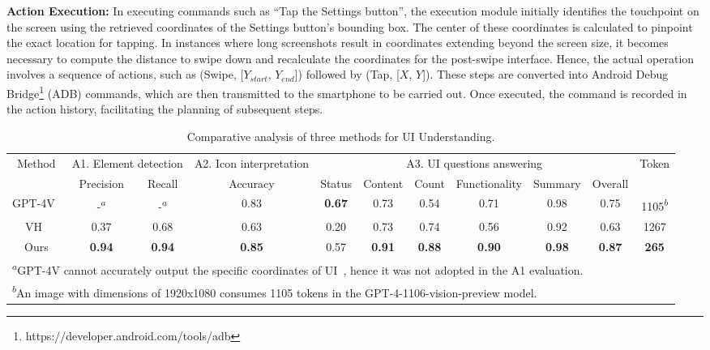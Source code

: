 \textbf{Action Execution:} In executing commands such as ``Tap the Settings button'', the execution module initially identifies the touchpoint on the screen using the retrieved coordinates of the Settings button's bounding box. The center of these coordinates is calculated to pinpoint the exact location for tapping. In instances where long screenshots result in coordinates extending beyond the screen size, it becomes necessary to compute the distance to swipe down and recalculate the coordinates for the post-swipe interface. Hence, the actual operation involves a sequence of actions, such as (Swipe, [$Y_{start}$, $Y_{end}$]) followed by (Tap, [$X$, $Y$]). These steps are converted into Android Debug Bridge\footnote{https://developer.android.com/tools/adb} (ADB) commands, which are then transmitted to the smartphone to be carried out. Once executed, the command is recorded in the action history, facilitating the planning of subsequent steps. 

\begin{table*}
    \centering
    \footnotesize
    \renewcommand{\arraystretch}{1.2}
    \caption{Comparative analysis of three methods for UI Understanding.}
    \label{tab:7_1}
    \begin{tabular}{ccccccccccc}
        \toprule
        \multirow{2}{*}{Method} & \multicolumn{2}{c}{A1. Element detection} & \multirow{1}{*}{A2. Icon interpretation} &\multicolumn{6}{c}{A3. UI  questions answering} & \multirow{2}{*}{Token}\\
        \cmidrule(lr){2-3} \cmidrule(lr){4-4} \cmidrule(lr){5-10}
        & Precision& Recall &   Accuracy   & Status & Content & Count & Functionality & Summary & Overall &     \\
        \midrule               
        GPT-4V~\cite{OpenAIGPT4V2023}&    -\textsuperscript{$a$} &    -\textsuperscript{$a$} & 0.83 & \textbf{0.67} & 0.73 & 0.54 & 0.71 & 0.98 & 0.75 & 1105\textsuperscript{$b$}\\
        VH~\cite{wang2023enabling}    & 0.37 & 0.68 & 0.63 & 0.20 & 0.73 & 0.74 & 0.56 & 0.92 & 0.63 & 1267 \\
        \rowcolor{lightgray!40}
        Ours  & \textbf{0.94} & \textbf{0.94} & \textbf{0.85} & 0.57 & \textbf{0.91} & \textbf{0.88} & \textbf{0.90} & \textbf{0.98} & \textbf{0.87} & \textbf{265}  \\
        \bottomrule
        \multicolumn{10}{l}{\textsuperscript{$a$}GPT-4V cannot accurately output the specific coordinates of UI~\cite{yang2023set}, hence it was not adopted in the A1 evaluation.}\\
        \multicolumn{10}{l}{\textsuperscript{$b$}An image with dimensions of 1920x1080 consumes 1105 tokens in the GPT-4-1106-vision-preview model.}\\
    \end{tabular}
\end{table*}

